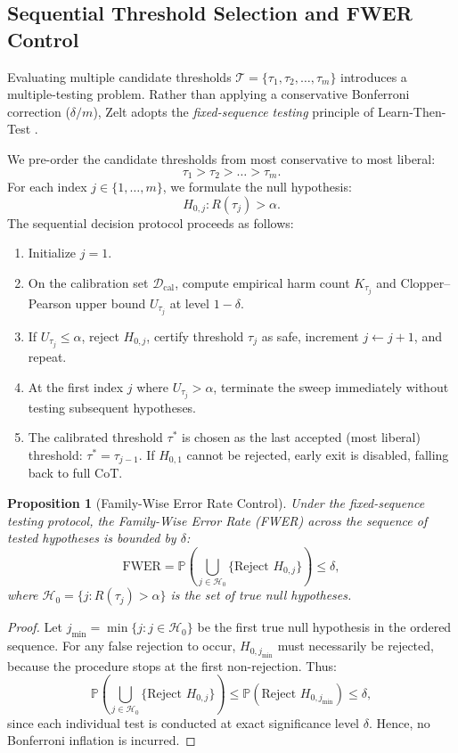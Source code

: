 \documentclass[11pt]{article}
\newtheorem{proposition}{Proposition}
\newcommand{\Prb}{\mathbb{P}}
\newcommand{\calD}{\mathcal{D}}
\newcommand{\calT}{\mathcal{T}}
\begin{document}
\subsection{Sequential Threshold Selection and FWER Control}
Evaluating multiple candidate thresholds $\calT = \{\tau_1, \tau_2, \dots, \tau_m\}$ introduces a multiple-testing problem. Rather than applying a conservative Bonferroni correction ($\delta / m$), Zelt adopts the \emph{fixed-sequence testing} principle of Learn-Then-Test \citep{angelopoulos2021learntest,maurer1995multiple}.

We pre-order the candidate thresholds from most conservative to most liberal:
\begin{equation}
  \tau_1 > \tau_2 > \dots > \tau_m.
\end{equation}
For each index $j \in \{1, \dots, m\}$, we formulate the null hypothesis:
\begin{equation}
  H_{0,j}: R(\tau_j) > \alpha.
\end{equation}
The sequential decision protocol proceeds as follows:
\begin{enumerate}
  \item Initialize $j = 1$.
  \item On the calibration set $\calD_{\mathrm{cal}}$, compute empirical harm count $K_{\tau_j}$ and Clopper--Pearson upper bound $U_{\tau_j}$ at level $1-\delta$.
  \item If $U_{\tau_j} \le \alpha$, reject $H_{0,j}$, certify threshold $\tau_j$ as safe, increment $j \leftarrow j+1$, and repeat.
  \item At the first index $j$ where $U_{\tau_j} > \alpha$, terminate the sweep immediately without testing subsequent hypotheses.
  \item The calibrated threshold $\tau^*$ is chosen as the last accepted (most liberal) threshold: $\tau^* = \tau_{j-1}$. If $H_{0,1}$ cannot be rejected, early exit is disabled, falling back to full CoT.
\end{enumerate}

\begin{proposition}[Family-Wise Error Rate Control]
Under the fixed-sequence testing protocol, the Family-Wise Error Rate (FWER) across the sequence of tested hypotheses is bounded by $\delta$:
\begin{equation}
  \mathrm{FWER} = \Prb\left(\bigcup_{j \in \mathcal{H}_0} \{\text{Reject } H_{0,j}\}\right) \le \delta,
\end{equation}
where $\mathcal{H}_0 = \{j : R(\tau_j) > \alpha\}$ is the set of true null hypotheses.
\end{proposition}
\begin{proof}
Let $j_{\min} = \min \{j : j \in \mathcal{H}_0\}$ be the first true null hypothesis in the ordered sequence. For any false rejection to occur, $H_{0, j_{\min}}$ must necessarily be rejected, because the procedure stops at the first non-rejection. Thus:
\[
  \Prb\left(\bigcup_{j \in \mathcal{H}_0} \{\text{Reject } H_{0,j}\}\right) \le \Prb\left(\text{Reject } H_{0, j_{\min}}\right) \le \delta,
\]
since each individual test is conducted at exact significance level $\delta$. Hence, no Bonferroni inflation is incurred.
\end{proof}
\end{document}
